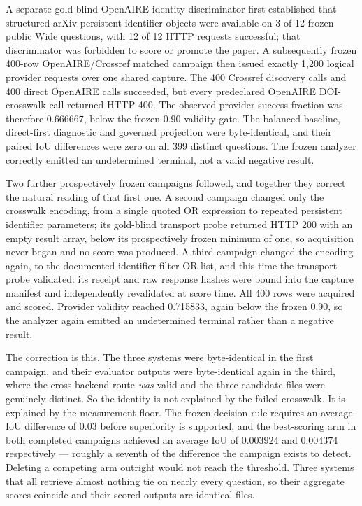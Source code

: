 A separate gold-blind OpenAIRE identity discriminator first established that
structured arXiv persistent-identifier objects were available on 3 of 12 frozen
public Wide questions, with 12 of 12 HTTP requests successful; that discriminator
was forbidden to score or promote the paper.  A subsequently frozen 400-row
OpenAIRE/Crossref matched campaign then issued exactly 1,200 logical provider
requests over one shared capture.  The 400 Crossref discovery calls and 400
direct OpenAIRE calls succeeded, but every predeclared OpenAIRE DOI-crosswalk
call returned HTTP 400.  The observed provider-success fraction was therefore
0.666667, below the frozen 0.90 validity gate.  The balanced baseline,
direct-first diagnostic and governed projection were byte-identical, and their
paired IoU differences were zero on all 399 distinct questions.  The frozen
analyzer correctly emitted an undetermined terminal, not a
valid negative result.

Two further prospectively frozen campaigns followed, and together they correct
the natural reading of that first one.  A second campaign changed only the
crosswalk encoding, from a single quoted OR expression to repeated persistent
identifier parameters; its gold-blind transport probe returned HTTP 200 with an
empty result array, below its prospectively frozen minimum of one, so
acquisition never began and no score was produced.  A third campaign changed the
encoding again, to the documented identifier-filter OR list, and this time the
transport probe validated: its receipt and raw response hashes were bound into
the capture manifest and independently revalidated at score time.  All 400 rows
were acquired and scored.  Provider validity reached 0.715833, again below the
frozen 0.90, so the analyzer again emitted an undetermined terminal
rather than a negative result.

The correction is this.  The three systems were byte-identical in the first
campaign, and their evaluator outputs were byte-identical again in the third,
where the cross-backend route \emph{was} valid and the three candidate files
were genuinely distinct.  So the identity is not explained by the failed
crosswalk.  It is explained by the measurement floor.  The frozen decision rule
requires an average-IoU difference of $0.03$ before superiority is supported,
and the best-scoring arm in both completed campaigns achieved an average IoU of
$0.003924$ and $0.004374$ respectively --- roughly a seventh of the difference
the campaign exists to detect.  Deleting a competing arm outright would not
reach the threshold.  Three systems that all retrieve almost nothing tie on
nearly every question, so their aggregate scores coincide and their scored
outputs are identical files.

